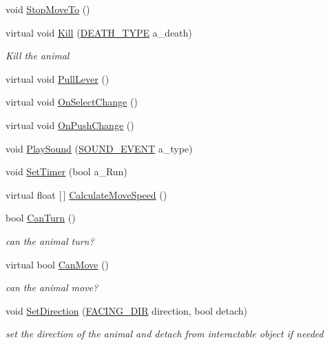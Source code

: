 \begin{DoxyCompactItemize}
void \mbox{\hyperlink{class_animal_a026f551709b7b9c8d22e3ccc47067bec}{Stop\+Move\+To}} ()
\item 
virtual void \mbox{\hyperlink{class_animal_a7edafcb2574e25a06224020ed0e5133c}{Kill}} (\mbox{\hyperlink{_animal_8cs_aa09ea87b75a706096f010aef7b9b1826}{D\+E\+A\+T\+H\+\_\+\+T\+Y\+PE}} a\+\_\+death)
\begin{DoxyCompactList}\small\item\em Kill the animal \end{DoxyCompactList}\item 
virtual void \mbox{\hyperlink{class_animal_a300d7a15f30a1e57ff1cccc86555b18a}{Pull\+Lever}} ()
\item 
virtual void \mbox{\hyperlink{class_animal_a10f83b51d56e077b400cf6b81b8f9aed}{On\+Select\+Change}} ()
\item 
virtual void \mbox{\hyperlink{class_animal_a001734bbca74a2240ab30be09746ecd1}{On\+Push\+Change}} ()
\item 
void \mbox{\hyperlink{class_animal_ab884d829130a352bb85070f3dc0fb888}{Play\+Sound}} (\mbox{\hyperlink{class_animal_aa498775210af23df33eb0095e81ecbf7}{S\+O\+U\+N\+D\+\_\+\+E\+V\+E\+NT}} a\+\_\+type)
\item 
void \mbox{\hyperlink{class_animal_a2e31c2fac8842ee6f66e7f79ac99d737}{Set\+Timer}} (bool a\+\_\+\+Run)
\item 
virtual float \mbox{[}$\,$\mbox{]} \mbox{\hyperlink{class_animal_ad1033798d72c010a822937be75c5bdde}{Calculate\+Move\+Speed}} ()
\item 
bool \mbox{\hyperlink{class_animal_a4fe2d98f1c17c588fc8f3dc8c1667972}{Can\+Turn}} ()
\begin{DoxyCompactList}\small\item\em can the animal turn? \end{DoxyCompactList}\item 
virtual bool \mbox{\hyperlink{class_animal_a50a5002837a408f0032cc6d84ba60d1e}{Can\+Move}} ()
\begin{DoxyCompactList}\small\item\em can the animal move? \end{DoxyCompactList}\item 
void \mbox{\hyperlink{class_animal_ac85273f85e93e6670c2f1346b72be873}{Set\+Direction}} (\mbox{\hyperlink{_animal_8cs_a57d10208ebba781ae206546ada2002b6}{F\+A\+C\+I\+N\+G\+\_\+\+D\+IR}} direction, bool detach)
\begin{DoxyCompactList}\small\item\em set the direction of the animal and detach from interactable object if needed \end{DoxyCompactList}\item 

\end{DoxyCompactItemize}
